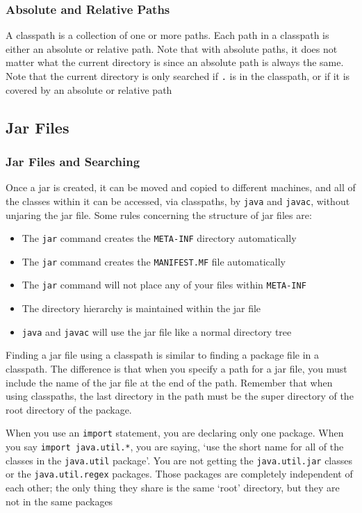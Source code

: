 \subsubsection{Absolute and Relative Paths}
A classpath is a collection of one or more paths. Each path in a classpath is 
either an absolute or relative path. Note that with absolute paths, it does not 
matter what the current directory is since an absolute path is always the same.
Note that the current directory is only searched if \verb#.# is in the 
classpath, or if it is covered by an absolute or relative path

\subsection{Jar Files}
\subsubsection{Jar Files and Searching}
Once a jar is created, it can be moved and copied to different machines, and 
all of the classes within it can be accessed, via classpaths, by \verb#java# 
and \verb#javac#, without unjaring the jar file. Some rules concerning the 
structure of jar files are:
\begin{itemize}
    \item The \verb#jar# command creates the \verb#META-INF# directory 
    automatically
    \item The \verb#jar# command creates the \verb#MANIFEST.MF# file 
    automatically
    \item The \verb#jar# command will not place any of your files within 
    \verb#META-INF#
    \item The directory hierarchy is maintained within the jar file
    \item \verb#java# and \verb#javac# will use the jar file like a normal 
    directory tree
\end{itemize}
Finding a jar file using a classpath is similar to finding a package file in a 
classpath. The difference is that when you specify a path for a jar file, you 
must include the name of the jar file at the end of the path. Remember that 
when using classpaths, the last directory in the path must be the super 
directory of the root directory of the package.

When you use an \verb#import# statement, you are declaring only one package.  
When you say \verb#import java.util.*#, you are saying, `use the short name for 
all of the classes in the \verb#java.util# package'. You are not getting the 
\verb#java.util.jar# classes or the \verb#java.util.regex# packages. Those 
packages are completely independent of each other; the only thing they share is 
the same `root' directory, but they are not in the same packages

